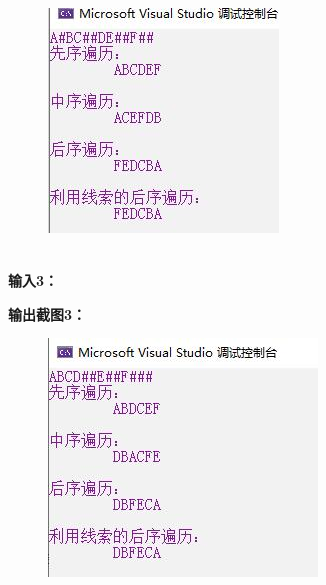 \documentclass[UTF8]{article}
\newcommand{\jumpLine} {\hspace*{\fill} \\}
\begin{document}
	\begin{figure}[H]
		\centering
		\includegraphics[width=0.5\linewidth]{test1_2.jpg}
		\label{test1_2}
	\end{figure}\par
	\jumpLine
	\textbf{输入3：}\par
	\par
	\textbf{输出截图3：}\par
	\begin{figure}[H]
		\centering
		\includegraphics[width=0.5\linewidth]{test1_3.jpg}
		\label{test1_3}
	\end{figure}\par
\end{document}
